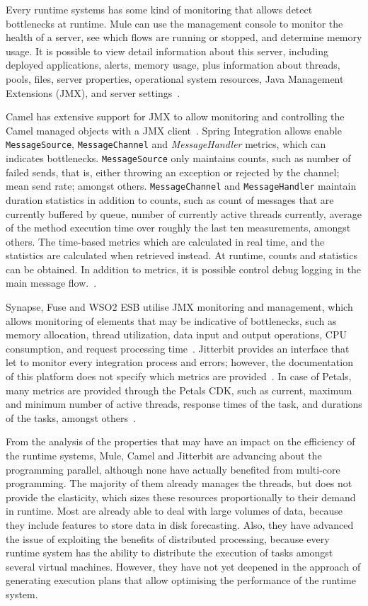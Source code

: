 Every runtime systems has some kind of monitoring that allows detect bottlenecks at runtime. Mule can use the management console to monitor the health of a server, see which flows are running or stopped, and determine memory usage. It is possible to view detail information about this server, including deployed applications, alerts, memory usage, plus information about threads, pools, files, server properties, operational system resources, Java Management Extensions (JMX), and server settings~\cite{Mule}. 

Camel has extensive support for JMX to allow monitoring and controlling the Camel managed objects with a JMX client~\cite{Camel}. Spring Integration allows enable \texttt{MessageSource}, \texttt{MessageChannel} and \textit{MessageHandler} metrics, which can indicates bottlenecks. \texttt{MessageSource} only maintains counts, such as number of failed sends, that is, either throwing an exception or rejected by the channel; mean send rate; amongst others. \texttt{MessageChannel} and \texttt{MessageHandler} maintain duration statistics in addition to counts, such as count of messages that are currently buffered by queue, number of currently active threads currently, average of the method execution time over roughly the last ten measurements, amongst others. The time-based metrics which are calculated in real time, and the statistics are calculated when retrieved instead. At runtime, counts and statistics can be obtained. In addition to metrics, it is possible control debug logging in the main message flow.~\cite{Spring}. 

Synapse, Fuse and WSO2 ESB utilise JMX monitoring and management, which allows monitoring of elements that may be indicative of bottlenecks, such as memory allocation, thread utilization, data input and output operations, CPU consumption, and request processing time~\cite{Snapse,Fuse}. Jitterbit provides an interface that let to monitor every integration process and errors; however, the documentation of this platform does not specify which metrics are provided~\cite{Jitterbit}. In case of Petals, many metrics are provided through the Petals CDK, such as current, maximum and minimum number of active threads, response times of the task, and durations of the tasks, amongst others~\cite{Petals}. 

From the analysis of the properties that may have an impact on the efficiency of the runtime systems, Mule, Camel and Jitterbit are advancing about the programming parallel, although none have actually benefited from multi-core programming. The majority of them already manages the threads, but does not provide the elasticity, which sizes these resources proportionally to their demand in runtime. Most are already able to deal with large volumes of data, because they include features to store data in disk forecasting. Also, they have advanced the issue of exploiting the benefits of distributed processing, because every runtime system has the ability to distribute the execution of tasks amongst several virtual machines. However, they have not yet deepened in the approach of generating execution plans that allow optimising the performance of the runtime system.

